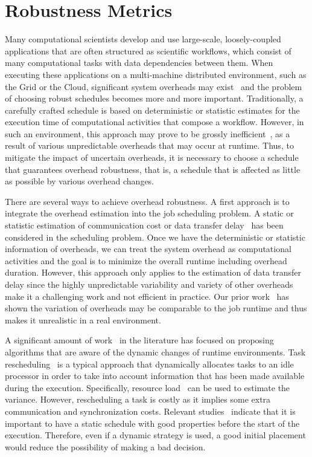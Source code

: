 
\section{Robustness Metrics}
\label{sec:sensitivity}


Many computational scientists develop and use large-scale, loosely-coupled applications that are often structured as scientific workflows, which consist of many computational tasks with data dependencies between them. When executing these applications on a multi-machine distributed environment, such as the Grid or the Cloud, significant system overheads may exist~\cite{Chen2011, Prodan2008, Dong2010, Yang03, Chen2012a} and the problem of choosing robust schedules becomes more and more important. Traditionally, a carefully crafted schedule is based on deterministic or statistic estimates for the execution time of computational activities that compose a workflow. However, in such an environment, this approach may prove to be grossly inefficient~\cite{Chen2012a}, as a result of various unpredictable overheads that may occur at runtime. 
Thus, to mitigate the impact of uncertain overheads, it is necessary to choose a schedule that guarantees overhead robustness, that is, a schedule that is affected as little as possible by various overhead changes.  

There are several ways to achieve overhead robustness. A first approach is to integrate the overhead estimation into the job scheduling problem. A static or statistic estimation of communication cost or data transfer delay~\cite{Dong2010, Yang03} has been considered in the scheduling problem. Once we have the deterministic or statistic information of overheads, we can treat the system overhead as computational activities and the goal is to minimize the overall runtime including overhead duration. However, this approach only applies to the estimation of data transfer delay since the highly unpredictable variability and variety of other overheads make it a challenging work and not efficient in practice. Our prior work~\cite{Chen2011} has shown the variation of overheads may be comparable to the job runtime and thus makes it unrealistic in a real environment.  

A significant amount of work~\cite{Chetto1990, Dong2010, Yang03} in the literature has focused on proposing algorithms that are aware of the dynamic changes of runtime environments. Task rescheduling~\cite{Sakellariou2004, Zhang2009a} is a typical approach that dynamically allocates tasks to an idle processor in order to take into account information that has been made available during the execution. Specifically, resource load~\cite{Dong2010} can be used to estimate the variance. However, rescheduling a task is costly as it implies some extra communication and synchronization costs. Relevant studies~\cite{Sakellariou2004} indicate that it is important to have a static schedule with good properties before the start of the execution. Therefore, even if a dynamic strategy is used, a good initial placement would reduce the possibility of making a bad decision. 

